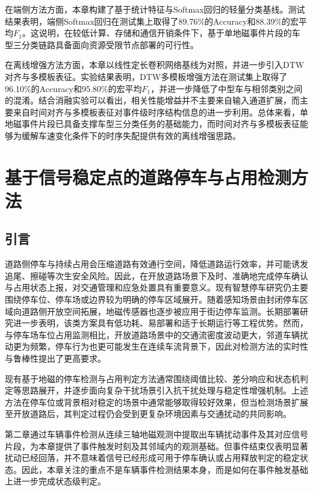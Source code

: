 \documentclass{xdupgthesis}
\begin{document}
在端侧方法方面，本章构建了基于统计特征与Softmax回归的轻量分类基线。测试结果表明，端侧Softmax回归在测试集上取得了89.76\%的Accuracy和88.39\%的宏平均$F_1$。这说明，在较低计算、存储和通信开销条件下，基于单地磁事件片段的车型三分类链路具备面向资源受限节点部署的可行性。

在离线增强方法方面，本章以线性定长卷积网络基线为对照，并进一步引入DTW对齐与多模板表征。实验结果表明，DTW多模板增强方法在测试集上取得了96.10\%的Accuracy和95.80\%的宏平均$F_1$，并进一步降低了中型车与相邻类别之间的混淆。结合消融实验可以看出，相关性能增益并不主要来自输入通道扩展，而主要来自时间对齐与多模板表征对事件级时序结构信息的进一步利用。总体来看，单地磁事件片段已具备支撑车型三分类任务的基础能力，而时间对齐与多模板表征能够为缓解车速变化条件下的时序失配提供有效的离线增强思路。




\chapter{基于信号稳定点的道路停车与占用检测方法}
\label{ch:ch4_parking}

\section{引言}
\label{sec:ch4_intro}

道路侧停车与持续占用会压缩道路有效通行空间，降低道路运行效率，并可能诱发追尾、擦碰等次生安全风险。因此，在开放道路场景下及时、准确地完成停车确认与占用状态上报，对交通管理和应急处置具有重要意义。现有智慧停车研究仍主要围绕停车位、停车场或边界较为明确的停车区域展开\cite{diazogas2020spsurvey}。随着感知场景由封闭停车区域向道路侧开放空间拓展，地磁传感器也逐步被应用于街边停车监测\cite{ch4_gu2013streetparking}。长期部署研究进一步表明，该类方案具有低功耗、易部署和适于长期运行等工程优势\cite{ch4_huang2017easydeploy}。然而，与停车场车位占用监测相比，开放道路场景中的交通流密度波动更大，邻道车辆扰动更为频繁，停车行为也更可能发生在连续车流背景下，因此对检测方法的实时性与鲁棒性提出了更高要求。

现有基于地磁的停车检测与占用判定方法通常围绕阈值比较、差分响应和状态机判定等思路展开，并逐步面向复杂干扰场景引入抗干扰处理与稳定性增强机制\cite{ch4_chen2019parkinglock}。上述方法在停车位或背景相对稳定的场景中通常能够取得较好效果，但当检测场景扩展至开放道路后，其判定过程仍会受到更复杂环境因素与交通扰动的共同影响。

第二章通过车辆事件检测从连续三轴地磁观测中提取出车辆扰动事件及其对应信号片段，为本章提供了事件触发时刻及其邻域内的观测基础。但事件结束仅表明显著扰动已经回落，并不意味着信号已经形成可用于停车确认或占用释放判定的稳定状态。因此，本章关注的重点不是车辆事件检测结果本身，而是如何在事件触发基础上进一步完成状态级判定。
\end{document}
